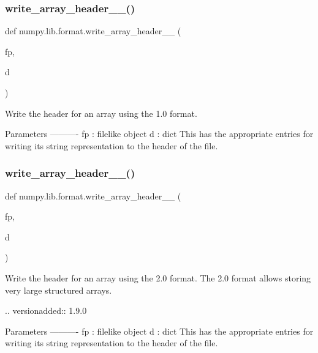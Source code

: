 \subsubsection{\texorpdfstring{write\+\_\+array\+\_\+header\+\_\+\_()}{write\_array\_header\_1\_0()}}
{\footnotesize\ttfamily def numpy.\+lib.\+format.\+write\+\_\+array\+\_\+header\+\_\+\_ (\begin{DoxyParamCaption}\item[{}]{fp,  }\item[{}]{d }\end{DoxyParamCaption})}

\begin{DoxyVerb}Write the header for an array using the 1.0 format.

Parameters
----------
fp : filelike object
d : dict
    This has the appropriate entries for writing its string
    representation to the header of the file.
\end{DoxyVerb}
 \mbox{\label{namespacenumpy_1_1lib_1_1format_a8d77dd28d804615fb8be21b34f3f9381}} 
\subsubsection{\texorpdfstring{write\+\_\+array\+\_\+header\+\_\+\_()}{write\_array\_header\_2\_0()}}
{\footnotesize\ttfamily def numpy.\+lib.\+format.\+write\+\_\+array\+\_\+header\+\_\+\_ (\begin{DoxyParamCaption}\item[{}]{fp,  }\item[{}]{d }\end{DoxyParamCaption})}

\begin{DoxyVerb}Write the header for an array using the 2.0 format.
    The 2.0 format allows storing very large structured arrays.

.. versionadded:: 1.9.0

Parameters
----------
fp : filelike object
d : dict
    This has the appropriate entries for writing its string
    representation to the header of the file.
\end{DoxyVerb}
 

